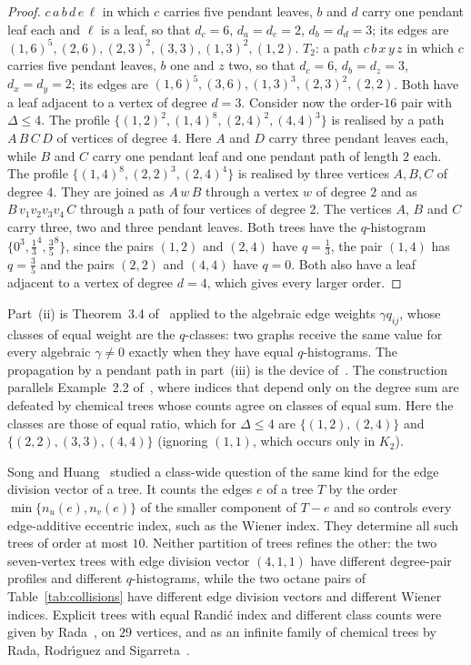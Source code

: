 \documentclass[a5paper, 10pt]{article}
\theoremstyle{plain}
\theoremstyle{remark}
\theoremstyle{definition}
\begin{document}
\begin{proof}
  $c\,a\,b\,d\,e\,\ell$ in which $c$ carries five pendant leaves, $b$ and
  $d$ carry one pendant leaf each and $\ell$ is a leaf, so that
  $d_c = 6$, $d_a = d_e = 2$, $d_b = d_d = 3$; its edges are
  $(1,6)^{5}, (2,6), (2,3)^{2}, (3,3), (1,3)^{2}, (1,2)$. $T_2$: a path
  $c\,b\,x\,y\,z$ in which $c$ carries five pendant leaves, $b$ one and
  $z$ two, so that $d_c = 6$, $d_b = d_z = 3$, $d_x = d_y = 2$; its
  edges are $(1,6)^{5}, (3,6), (1,3)^{3}, (2,3)^{2}, (2,2)$. Both have a
  leaf adjacent to a vertex of degree $d = 3$. Consider now the order-$16$ pair with $\Delta \le 4$. The profile
  $\{(1,2)^{2}, (1,4)^{8}, (2,4)^{2}, (4,4)^{3}\}$ is realised by a path
  $A\,B\,C\,D$ of vertices of degree $4$. Here $A$ and $D$ carry three
  pendant leaves each, while $B$ and $C$ carry one pendant leaf and one
  pendant path of length $2$ each. The profile $\{(1,4)^{8}, (2,2)^{3}, (2,4)^{4}\}$ is realised by
  three vertices $A, B, C$ of degree $4$. They are joined as $A\,w\,B$
  through a vertex $w$ of degree $2$ and as $B\,v_1 v_2 v_3 v_4\,C$
  through a path of four
  vertices of degree $2$. The vertices $A$, $B$ and $C$ carry three, two
  and three pendant leaves. Both trees have the
  $q$-histogram $\{0^{3}, \tfrac13^{4}, \tfrac35^{8}\}$, since the pairs
  $(1,2)$ and $(2,4)$ have $q = \tfrac13$, the pair $(1,4)$ has
  $q = \tfrac35$ and the pairs $(2,2)$ and $(4,4)$ have $q = 0$. Both also
  have a leaf adjacent to a vertex of degree $d = 4$, which gives every
  larger order.
  \end{proof}

  Part~(ii) is Theorem~3.4 of~\cite{Rada2019ExpVDB} applied to the algebraic edge weights $\gamma q_{ij}$, whose classes of equal weight are the $q$-classes: two graphs receive the same value for every algebraic $\gamma \neq 0$ exactly when they have equal $q$-histograms. The propagation by a pendant path in part~(iii) is the device of~\cite{Rada2026LinearVDB}. The construction parallels Example~2.2 of~\cite{RadaRodriguezSigarreta2022Weak}, where indices that depend only on the degree sum are defeated by chemical trees whose counts agree on classes of equal sum. Here the classes are those of equal ratio, which for $\Delta \le 4$ are $\{(1,2),(2,4)\}$ and $\{(2,2),(3,3),(4,4)\}$ (ignoring $(1,1)$, which occurs only in $K_2$).

  Song and Huang~\cite{SongHuang2023EDV} studied a class-wide question of the same kind for the edge division vector of a tree. It counts the edges $e$ of a tree $T$ by the order $\min\{n_u(e), n_v(e)\}$ of the smaller component of $T - e$ and so controls every edge-additive eccentric index, such as the Wiener index. They determine all such trees of order at most $10$. Neither partition of trees refines the other: the two seven-vertex trees with edge division vector $(4,1,1)$ have different degree-pair profiles and different $q$-histograms, while the two octane pairs of Table~\ref{tab:collisions} have different edge division vectors and different Wiener indices. Explicit trees with equal Randi\'c index and different class counts were given by Rada~\cite[Example~2.6]{Rada2019ExpVDB}, on $29$ vertices, and as an infinite family of chemical trees by Rada, Rodr\'{\i}guez and Sigarreta~\cite[Example~2.1]{RadaRodriguezSigarreta2022Weak}.
\end{document}
